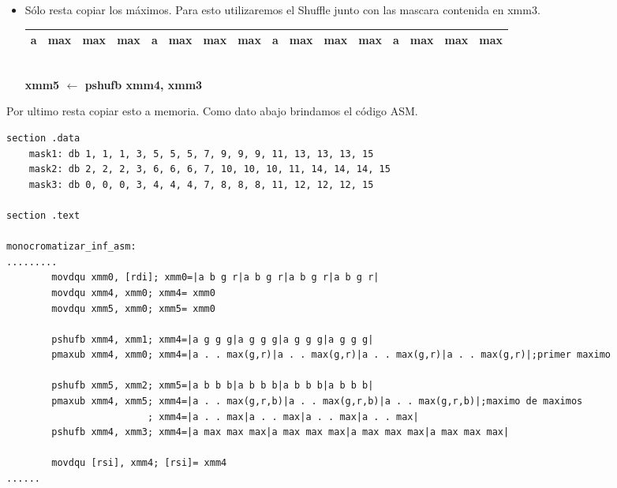 \begin{itemize}
	\item Sólo resta copiar los máximos. Para esto utilizaremos el Shuffle junto con las mascara contenida en xmm3.

		\begin{center}
		   \begin{tabular}{| c | c | c | c || c | c | c | c || c | c | c | c || c | c | c | c |}
			 \hline
			 a & max & max & max & a & max & max & max & a & max & max & max & a & max & max & max  \\ \hline
		   \end{tabular}
		   \\ \textbf{xmm5 $\gets$ pshufb xmm4, xmm3}
		\end{center}

\end{itemize}

Por ultimo resta copiar esto a memoria. 
Como dato abajo brindamos el código ASM.

\begin{codesnippet}
\begin{verbatim}
section .data
	mask1: db 1, 1, 1, 3, 5, 5, 5, 7, 9, 9, 9, 11, 13, 13, 13, 15
	mask2: db 2, 2, 2, 3, 6, 6, 6, 7, 10, 10, 10, 11, 14, 14, 14, 15
	mask3: db 0, 0, 0, 3, 4, 4, 4, 7, 8, 8, 8, 11, 12, 12, 12, 15

section .text

monocromatizar_inf_asm:
.........
		movdqu xmm0, [rdi]; xmm0=|a b g r|a b g r|a b g r|a b g r|
		movdqu xmm4, xmm0; xmm4= xmm0
		movdqu xmm5, xmm0; xmm5= xmm0

		pshufb xmm4, xmm1; xmm4=|a g g g|a g g g|a g g g|a g g g|
		pmaxub xmm4, xmm0; xmm4=|a . . max(g,r)|a . . max(g,r)|a . . max(g,r)|a . . max(g,r)|;primer maximo
 
		pshufb xmm5, xmm2; xmm5=|a b b b|a b b b|a b b b|a b b b|			
		pmaxub xmm4, xmm5; xmm4=|a . . max(g,r,b)|a . . max(g,r,b)|a . . max(g,r,b)|;maximo de maximos
						 ; xmm4=|a . . max|a . . max|a . . max|a . . max|	
		pshufb xmm4, xmm3; xmm4=|a max max max|a max max max|a max max max|a max max max|

		movdqu [rsi], xmm4; [rsi]= xmm4
......
\end{verbatim}
\end{codesnippet}
